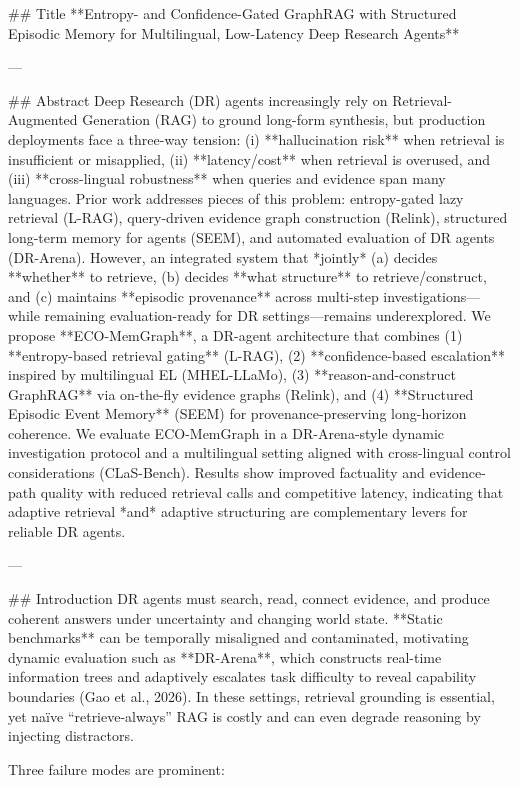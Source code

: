 ## Title  
**Entropy- and Confidence-Gated GraphRAG with Structured Episodic Memory for Multilingual, Low-Latency Deep Research Agents**

---

## Abstract  
Deep Research (DR) agents increasingly rely on Retrieval-Augmented Generation (RAG) to ground long-form synthesis, but production deployments face a three-way tension: (i) **hallucination risk** when retrieval is insufficient or misapplied, (ii) **latency/cost** when retrieval is overused, and (iii) **cross-lingual robustness** when queries and evidence span many languages. Prior work addresses pieces of this problem: entropy-gated lazy retrieval (L-RAG), query-driven evidence graph construction (Relink), structured long-term memory for agents (SEEM), and automated evaluation of DR agents (DR-Arena). However, an integrated system that *jointly* (a) decides **whether** to retrieve, (b) decides **what structure** to retrieve/construct, and (c) maintains **episodic provenance** across multi-step investigations—while remaining evaluation-ready for DR settings—remains underexplored.  
We propose **ECO-MemGraph**, a DR-agent architecture that combines (1) **entropy-based retrieval gating** (L-RAG), (2) **confidence-based escalation** inspired by multilingual EL (MHEL-LLaMo), (3) **reason-and-construct GraphRAG** via on-the-fly evidence graphs (Relink), and (4) **Structured Episodic Event Memory** (SEEM) for provenance-preserving long-horizon coherence. We evaluate ECO-MemGraph in a DR-Arena-style dynamic investigation protocol and a multilingual setting aligned with cross-lingual control considerations (CLaS-Bench). Results show improved factuality and evidence-path quality with reduced retrieval calls and competitive latency, indicating that adaptive retrieval *and* adaptive structuring are complementary levers for reliable DR agents.

---

## Introduction  
DR agents must search, read, connect evidence, and produce coherent answers under uncertainty and changing world state. **Static benchmarks** can be temporally misaligned and contaminated, motivating dynamic evaluation such as **DR-Arena**, which constructs real-time information trees and adaptively escalates task difficulty to reveal capability boundaries (Gao et al., 2026). In these settings, retrieval grounding is essential, yet naïve “retrieve-always” RAG is costly and can even degrade reasoning by injecting distractors.

Three failure modes are prominent:

